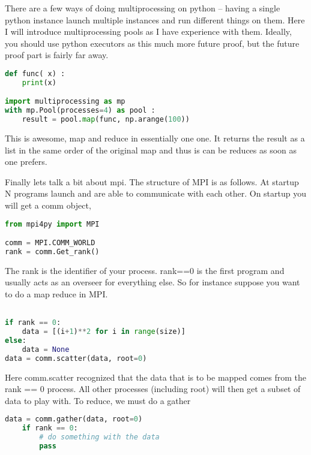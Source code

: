 There are a few ways of doing multiprocessing on python -- having a single python instance launch multiple instances and run different things on them.  Here I will introduce multiprocessing pools as I have experience with them.  Ideally, you should use python executors as this much more future proof, but the future proof part is fairly far away. 
\begin{lstlisting}[language=Python]
def func( x) : 
    print(x)

import multiprocessing as mp
with mp.Pool(processes=4) as pool :
    result = pool.map(func, np.arange(100))
\end{lstlisting}
This is awesome, map and reduce in essentially one one.  It returns the result as a list in the same order of the original map and thus is can be reduces as soon as one prefers.  

Finally lets talk a bit about mpi.  The structure of MPI is as follows.  At startup N programs launch and are able to communicate with each other.  On startup you will get a comm object,
\begin{lstlisting}[language=Python]
from mpi4py import MPI

comm = MPI.COMM_WORLD
rank = comm.Get_rank()
\end{lstlisting}
The rank is the identifier of your process.  rank==0 is the first program and usually acts as an overseer for everything else.  So for instance suppose you want to do a map reduce in MPI. 
\begin{lstlisting}[language=Python]

if rank == 0:
    data = [(i+1)**2 for i in range(size)]
else:
    data = None
data = comm.scatter(data, root=0)
\end{lstlisting}
Here comm.scatter recognized that the data that is to be mapped comes from the rank == 0 process.  All other processes (including root) will then get a subset of data to play with.  To reduce, we must do a gather
\begin{lstlisting}[language=Python]
    data = comm.gather(data, root=0)
    if rank == 0:
        # do something with the data
        pass
\end{lstlisting}
    